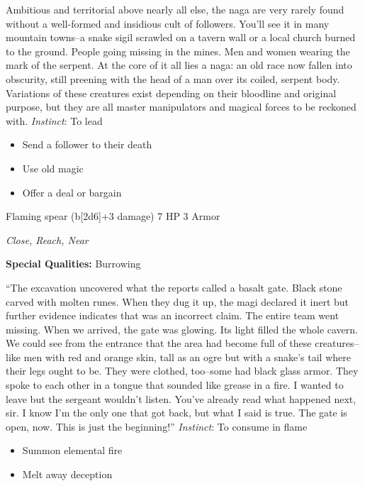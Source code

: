 \HRule
Ambitious and territorial above nearly all else, the naga are very rarely found without a well-formed and insidious cult of followers. You'll see it in many mountain towns--a snake sigil scrawled on a tavern wall or a local church burned to the ground. People going missing in the mines. Men and women wearing the mark of the serpent. At the core of it all lies a naga: an old race now fallen into obscurity, still preening with the head of a man over its coiled, serpent body. Variations of these creatures exist depending on their bloodline and original purpose, but they are all master manipulators and magical forces to be reckoned with. \emph{Instinct}: To lead
\begin{itemize}
\item Send a follower to their death
\item Use old magic
\item Offer a deal or bargain
\end{itemize}
\newpage
\HRule
{}

Flaming spear (b[2d6]+3 damage)\hspace*{\fill} 7 HP 3 Armor

\emph{Close, Reach, Near}

\textbf{Special Qualities:}
Burrowing

\HRule
``The excavation uncovered what the reports called a basalt gate. Black stone carved with molten runes. When they dug it up, the magi declared it inert but further evidence indicates that was an incorrect claim. The entire team went missing. When we arrived, the gate was glowing. Its light filled the whole cavern. We could see from the entrance that the area had become full of these creatures--like men with red and orange skin, tall as an ogre but with a snake's tail where their legs ought to be. They were clothed, too--some had black glass armor. They spoke to each other in a tongue that sounded like grease in a fire. I wanted to leave but the sergeant wouldn't listen. You've already read what happened next, sir. I know I'm the only one that got back, but what I said is true. The gate is open, now. This is just the beginning!'' \emph{Instinct}: To consume in flame
\begin{itemize}
\item Summon elemental fire
\item Melt away deception
\end{itemize}
